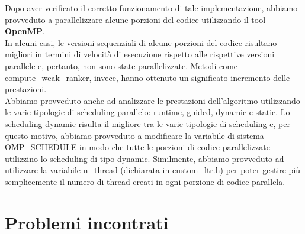 Dopo aver verificato il corretto funzionamento di tale implementazione, abbiamo provveduto a parallelizzare alcune porzioni del codice utilizzando il tool \textbf{OpenMP}. \\
In alcuni casi, le versioni sequenziali di alcune porzioni del codice risultano migliori in termini di velocità di esecuzione rispetto alle rispettive versioni parallele e, pertanto, non sono state parallelizzate. Metodi come compute\_weak\_ranker, invece, hanno ottenuto un significato incremento delle prestazioni.\\
Abbiamo provveduto anche ad analizzare le prestazioni dell'algoritmo utilizzando le varie tipologie di scheduling parallelo: runtime, guided, dynamic e static. Lo scheduling dynamic risulta il migliore tra le varie tipologie di scheduling e, per questo motivo, abbiamo provveduto a modificare la variabile di sistema OMP\_SCHEDULE in modo che tutte le porzioni di codice parallelizzate utilizzino lo scheduling di tipo dynamic. Similmente, abbiamo provveduto ad utilizzare la variabile n\_thread (dichiarata in custom\_ltr.h) per poter gestire più semplicemente il numero di thread creati in ogni porzione di codice parallela.

	\section*{Problemi incontrati}

